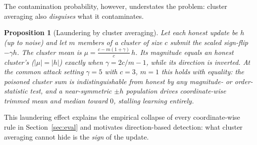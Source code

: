 \documentclass[conference]{IEEEtran}
\newtheorem{proposition}{Proposition}
\begin{document}
The contamination probability, however, understates the problem: cluster averaging
also \emph{disguises} what it contaminates.

\begin{proposition}[Laundering by cluster averaging]\label{prop:launder}
Let each honest update be $h$ (up to noise) and let $m$ members of a cluster of size
$c$ submit the scaled sign-flip $-\gamma h$. The cluster mean is
$\mu = \frac{c - m(1+\gamma)}{c}\, h$. Its magnitude equals an honest cluster's
($|\mu| = |h|$) exactly when $\gamma = 2c/m - 1$, while its direction is inverted.
At the common attack setting $\gamma{=}5$ with $c{=}3$, $m{=}1$ this holds with
equality: the poisoned cluster sum is indistinguishable from honest by any
magnitude- or order-statistic test, and a near-symmetric $\pm h$ population drives
coordinate-wise trimmed mean and median toward $0$, stalling learning entirely.
\end{proposition}

This laundering effect explains the empirical collapse of every coordinate-wise
rule in Section~\ref{sec:eval} and motivates direction-based detection: what
cluster averaging cannot hide is the \emph{sign} of the update.
\end{document}
